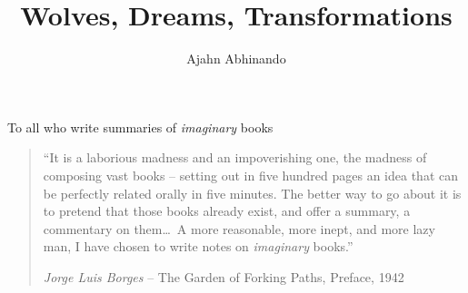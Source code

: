 \documentclass[11pt,twoside,final]{memoir}
\title{Wolves, Dreams, Transformations}
\subtitle{}
\author{Ajahn Abhinando}
\date{}
\begin{document}
\emptysheet


\frontmatter*


\cleartoverso
\thispagestyle{empty}



\cleartorecto
\thispagestyle{empty}



\cleartoverso
\thispagestyle{empty}



\cleartorecto
\thispagestyle{empty}
{\raggedleft\vspace*{5em}\par
To all who write summaries of \emph{imaginary} books
\par}


\cleartorecto
\tableofcontents*



\cleartorecto
\thispagestyle{empty}
{\raggedleft\vspace*{5em}

\begin{minipage}{0.9\linewidth}

\begin{quote}
``It is a laborious madness and an impoverishing one, the madness of composing vast books -- setting out in five hundred pages an idea that can be perfectly related orally in five minutes. The better way to go about it is to pretend that those books already exist, and offer a summary, a commentary on them\ldots\ A more reasonable, more inept, and more lazy man, I have chosen to write notes on \emph{imaginary} books.''

{\small\textit{Jorge Luis Borges} -- The Garden of Forking Paths, Preface, 1942}
\end{quote}

\end{minipage}

}
\end{document}
